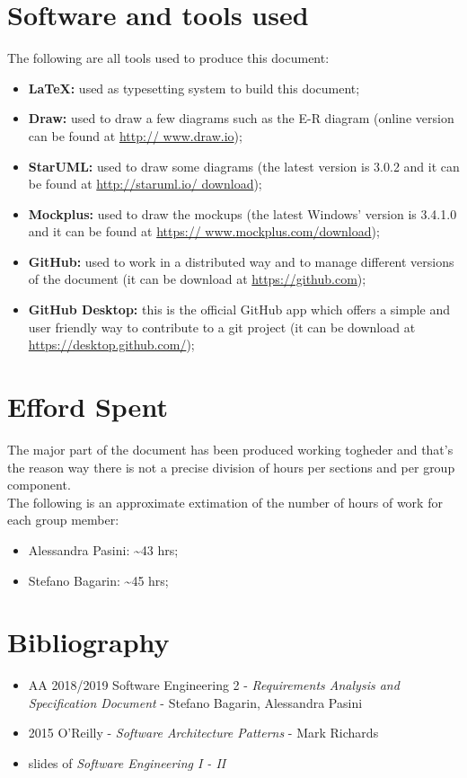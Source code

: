 \section{Software and tools used}
The following are all tools used to produce this document:
\begin{itemize}
	\item \textbf{\LaTeX:} used as typesetting system to build this document;
	\item \textbf{Draw:} used to draw a few diagrams such as the E-R diagram (online version can be found at \url{http://				www.draw.io});
	\item \textbf{StarUML:} used to draw some diagrams (the latest version is 3.0.2 and it can be found at \url{http://staruml.io/			download});
	\item \textbf{Mockplus:} used to draw the mockups (the latest Windows' version is 3.4.1.0 and it can be found at \url{https://			www.mockplus.com/download});
	\item \textbf{GitHub:} used to work in a distributed way and to manage different versions of the document (it can be download at		\url{https://github.com});
	\item \textbf{GitHub Desktop:} this is the official GitHub app which offers a simple and user friendly way to contribute to a git 			project (it can be download at \url{https://desktop.github.com/});
\end{itemize}

\section{Efford Spent}
The major part of the document has been produced working togheder and that's the reason way there is not a precise division of hours per sections and per group component.\\
The following is an approximate extimation of the number of hours of work for each group member:
\begin{itemize}
\item Alessandra Pasini: \textasciitilde 43 hrs;
\item Stefano Bagarin: \textasciitilde 45 hrs;
\end{itemize}

\section{Bibliography}
\begin{itemize}
	\item AA 2018/2019 Software Engineering 2 - \emph{Requirements Analysis and Specification Document} - Stefano Bagarin, 			Alessandra Pasini
	\item 2015 O'Reilly -  \emph{Software Architecture Patterns} - Mark Richards
	\item slides of \emph{Software Engineering I - II}
\end{itemize}
